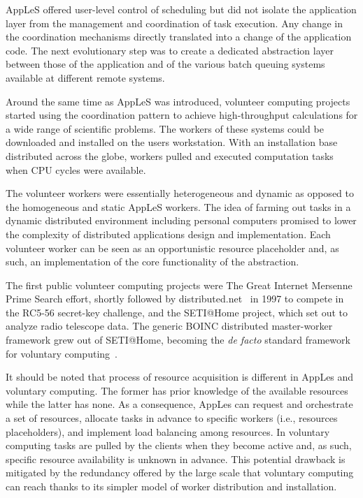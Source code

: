 \documentclass{sig-alternate}
\begin{document}
AppLeS offered user-level control of scheduling but did not isolate the
application layer from the management and coordination of task execution. Any
change in the coordination mechanisms directly translated into a change of the
application code. The next evolutionary step was to create a dedicated
abstraction layer between those of the application and of the various batch
queuing systems available at different remote systems.

Around the same time as AppLeS was introduced, volunteer computing projects
started using the \MW coordination pattern to achieve high-throughput
calculations for a wide range of scientific problems. The workers of these
systems could be downloaded and installed on the users workstation.
With an installation base distributed across the globe, workers pulled and
executed computation tasks when CPU cycles were available.

The volunteer workers were essentially heterogeneous and dynamic as opposed to
the homogeneous and static AppLeS workers. The idea of farming out tasks in a
dynamic distributed environment including personal computers promised to lower
the complexity of distributed applications design and implementation. Each
volunteer worker can be seen as an opportunistic resource placeholder and, as
such, an implementation of the core functionality of the \pilot abstraction.

The first public volunteer computing projects were The Great Internet Mersenne
Prime Search effort\cite{woltman2004great}, shortly followed by
distributed.net~\cite{lawton2000distributed} in 1997 to compete in the
RC5-56 secret-key challenge, and the SETI@Home project, which set out to
analyze radio telescope data. The generic BOINC distributed master-worker
framework grew out of SETI@Home, becoming the {\it de facto} standard framework
for voluntary computing~\cite{anderson2004boinc}.

It should be noted that process of resource acquisition is different in AppLes
and voluntary computing. The former has prior knowledge of the available
resources while the latter has none. As a consequence, AppLes can request and
orchestrate a set of resources, allocate tasks in advance to specific workers
(i.e., resources placeholders), and implement load balancing among resources. In
voluntary computing tasks are pulled by the clients when they become active and,
as such, specific resource availability is unknown in advance. This potential
drawback is mitigated by the redundancy offered by the large scale that
voluntary computing can reach thanks to its simpler model of worker distribution
and installation.
\end{document}
